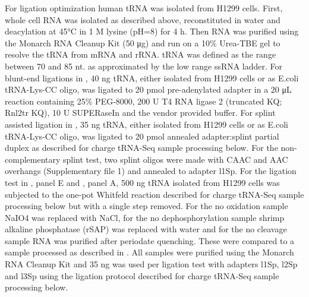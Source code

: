 \documentclass[9pt,lineno]{elife}
\begin{document}
For ligation optimization human tRNA was isolated from H1299 cells.
First, whole cell RNA was isolated as described above, reconstituted in water and deacylation at 45°C in 1 M lysine (pH=8) for 4 h.
Then RNA was purified using the Monarch RNA Cleanup Kit (50 μg) and run on a 10\% Urea-TBE gel to resolve the tRNA from mRNA and rRNA.
tRNA was defined as the range between 70 and 85 nt. as approximated by the low range ssRNA ladder.
For blunt-end ligations in , 40 ng tRNA, either isolated from H1299 cells or as E.coli tRNA-Lys-CC oligo, was ligated to 20 pmol pre-adenylated adapter in a 20 μL reaction containing 25\% PEG-8000, 200 U T4 RNA ligase 2 (truncated KQ; Rnl2tr KQ), 10 U SUPERaseIn and the vendor provided buffer.
For splint assisted ligation in , 35 ng tRNA, either isolated from H1299 cells or as E.coli tRNA-Lys-CC oligo, was ligated to 20 pmol annealed adapter:splint partial duplex as described for charge tRNA-Seq sample processing below.
For the non-complementary splint test, two splint oligos were made with CAAC and AAC overhangs (Supplementary file 1) and annealed to adapter l1Sp.
For the ligation test in , panel E and , panel A, 500 ng tRNA isolated from H1299 cells was subjected to the one-pot Whitfeld reaction described for charge tRNA-Seq sample processing below but with a single step removed.
For the no oxidation sample NaIO4 was replaced with NaCl, for the no dephosphorylation sample shrimp alkaline phosphatase (rSAP) was replaced with water and for the no cleavage sample RNA was purified after periodate quenching.
These were compared to a sample processed as described in \cite{Evans2017-st}.
All samples were purified using the Monarch RNA Cleanup Kit and 35 ng was used per ligation test with adapters l1Sp, l2Sp and l3Sp using the ligation protocol described for charge tRNA-Seq sample processing below.
\end{document}
